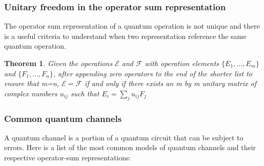 \documentclass{article}
\newtheorem{theorem}{Theorem}
\begin{document}
\subsubsection{Unitary freedom in the operator sum representation}

The operator sum representation of a quantum operation is not unique and there
is a useful criteria to understand when two representation reference the same
quantum operation.
\begin{theorem}
	\label{freedom}
	Given the operations $\mathcal{E}$ and $\mathcal{F}$ with operation elements
	$\{E_1,...,E_m\}$ and $\{F_1,...,F_n\}$, after appending zero operators
	to the end of the shorter list to ensure that m=n,
	$\mathcal{E}=\mathcal{F}$ if and only if there exists an m by m unitary matrix
	of complex numbers $u_{ij}$ such that $E_i = \sum_j u_{ij} F_j$

\end{theorem}



\subsubsection{Common quantum channels}
A quantum channel is a portion of a quantum circuit that can be subject to errors.
Here is a list of the most common models of quantum channels and their respective
operator-sum representations:
\end{document}
